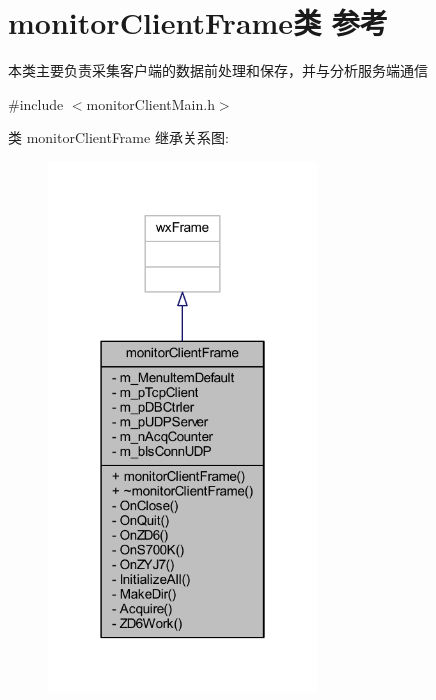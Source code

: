 \hypertarget{classmonitor_client_frame}{}\section{monitor\+Client\+Frame类 参考}
\label{classmonitor_client_frame}


本类主要负责采集客户端的数据前处理和保存，并与分析服务端通信  




{\ttfamily \#include $<$monitor\+Client\+Main.\+h$>$}



类 monitor\+Client\+Frame 继承关系图\+:\nopagebreak
\begin{figure}[H]
\begin{center}
\leavevmode
\includegraphics[width=202pt]{classmonitor_client_frame__inherit__graph}
\end{center}
\end{figure}


